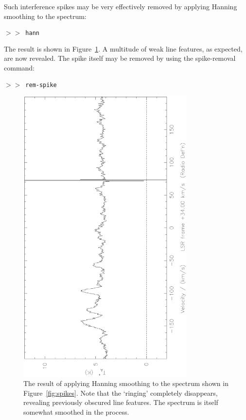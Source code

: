 \documentclass[11pt,twoside]{article}
\newcommand{\SP}{{$>\!>$}}
\begin{document}
Such interference spikes may be very effectively removed by applying
Hanning smoothing to the spectrum:

\SP\ {\tt hann}

The result is shown in Figure~\ref{fig:despiked}. A multitude of weak
line features, as expected, are now revealed. The spike itself may be
removed by using the spike-removal command:

\SP\ {\tt rem-spike}

\begin{figure}[htb]
\centering
\includegraphics[angle=-90,width=3.5in]{sc8_despiked.ps}
\vspace*{-0.5cm}
\begin{center}
\begin{minipage}[t]{5.5in}
\caption[Hanning-smoothing removes `ringing']
{\small{The result of applying Hanning smoothing to the spectrum shown
in Figure~\ref{fig:spikes}. Note that the `ringing' completely
disappears, revealing previously obscured line features. The spectrum
is itself somewhat smoothed in the process.  }}
\label{fig:despiked}
\end{minipage}
\end{center}
\end{figure}
\end{document}
